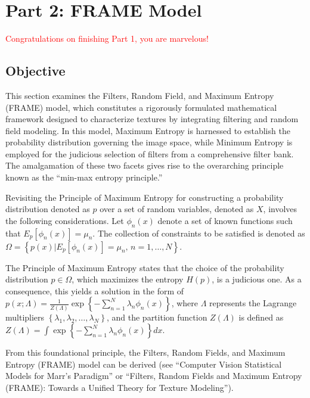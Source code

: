 \documentclass[11pt]{article}
\begin{document}
\section{Part 2: FRAME Model}

\textcolor{red}{Congratulations on finishing Part 1, you are marvelous!}

\subsection{Objective}

This section examines the Filters, Random Field, and Maximum Entropy (FRAME) model, which constitutes a rigorously formulated mathematical framework designed to characterize textures by integrating filtering and random field modeling. In this model, Maximum Entropy is harnessed to establish the probability distribution governing the image space, while Minimum Entropy is employed for the judicious selection of filters from a comprehensive filter bank. The amalgamation of these two facets gives rise to the overarching principle known as the ``min-max entropy principle.''

Revisiting the Principle of Maximum Entropy for constructing a probability distribution denoted as $p$ over a set of random variables, denoted as $X$, involves the following considerations. Let $\phi_{n}(x)$ denote a set of known functions such that $E_{p}\left[\phi _{n}\left(x\right)\right]=\mu _{n}$. The collection of constraints to be satisfied is denoted as $\Omega =\left\{p\left(x\right)| E_{p}\left[\phi _{n}\left(x\right)\right]=\mu _{n},\, n=1,\ldots ,N\right\}$.

The Principle of Maximum Entropy states that the choice of the probability distribution $p\in \Omega $, which maximizes the entropy $H(p)$, is a judicious one. As a consequence, this yields a solution in the form of $p\left(x;\Lambda \right)=\frac{1}{Z(\Lambda )}\exp \left\{-{\sum }_{n=1}^{N}\lambda _{n}\phi _{n}\left(x\right)\right\}$, where $\Lambda$ represents the Lagrange multipliers $\left\{\lambda _{1},\lambda _{2},\ldots ,\lambda _{N}\right\}$, and the partition function $Z\left(\Lambda \right)$ is defined as $Z\left(\Lambda \right)=\int \exp \left\{-{\sum }_{n=1}^{N}\lambda _{n}\phi _{n}\left(x\right)\right\}dx$.

From this foundational principle, the Filters, Random Fields, and Maximum Entropy (FRAME) model can be derived (see ``Computer Vision \textendash{} Statistical Models for Marr's Paradigm'' or ``Filters, Random Fields and Maximum Entropy (FRAME): Towards a Unified Theory for Texture Modeling'').
\end{document}

